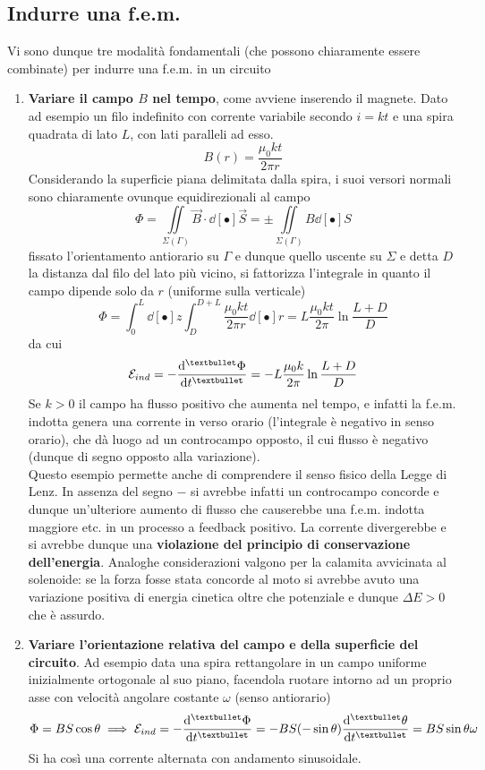 \subsection{Indurre una f.e.m.}
Vi sono dunque tre modalità fondamentali (che possono chiaramente essere combinate) per indurre una f.e.m. in un circuito
\begin{enumerate}
\item \textbf{Variare il campo $B$ nel tempo}, come avviene inserendo il magnete. Dato ad esempio un filo indefinito con corrente variabile secondo $i = kt$ e una spira quadrata di lato $L$, con lati paralleli ad esso.
\[B(r) = \frac{\mu_0 k t}{2 \pi r}\]
Considerando la superficie piana delimitata dalla spira, i suoi versori normali sono chiaramente ovunque equidirezionali al campo
\[\Phi = \iint\limits_{\Sigma (\Gamma)} \vec{B} \cdot \dd[•]{\vec{S}} = \pm \iint\limits_{\Sigma (\Gamma)} B \dd[•]{S}\]
fissato l'orientamento antiorario su $\Gamma$ e dunque quello uscente su $\Sigma$ e detta $D$ la distanza dal filo del lato più vicino, si fattorizza l'integrale in quanto il campo dipende solo da $r$ (uniforme sulla verticale)
\[\Phi = \int_0^L \dd[•]{z} \int_D^{D+L} \frac{\mu_0 k t}{2 \pi r} \dd[•]{r} = L \frac{\mu_0 k t}{2 \pi} \ln \frac{L+D}{D}\]
da cui
\[\mathcal{E}_{ind} = - \dv[•]{\Phi}{t} = - L \frac{\mu_0 k}{2 \pi} \ln \frac{L+D}{D}\]
Se $k > 0$ il campo ha flusso positivo che aumenta nel tempo, e infatti la f.e.m. indotta genera una corrente in verso orario (l'integrale è negativo in senso orario), che dà luogo ad un controcampo opposto, il cui flusso è negativo (dunque di segno opposto alla variazione).
\\Questo esempio permette anche di comprendere il senso fisico della Legge di Lenz. In assenza del segno $-$ si avrebbe infatti un controcampo concorde e dunque un'ulteriore aumento di flusso che causerebbe una f.e.m. indotta maggiore etc. in un processo a feedback positivo. La corrente divergerebbe e si avrebbe dunque una \textbf{violazione del principio di conservazione dell'energia}. Analoghe considerazioni valgono per la calamita avvicinata al solenoide: se la forza fosse stata concorde al moto si avrebbe avuto una variazione positiva di energia cinetica oltre che potenziale e dunque $\Delta E > 0$ che è assurdo.

\item \textbf{Variare l'orientazione relativa del campo e della superficie del circuito}. Ad esempio data una spira rettangolare in un campo uniforme inizialmente ortogonale al suo piano, facendola ruotare intorno ad un proprio asse con velocità angolare costante $\omega$ (senso antiorario)
\[\Phi = B S \cos \theta \implies \mathcal{E}_{ind} = - \dv[•]{\Phi}{t} = - B S (- \sin \theta) \dv[•]{\theta}{t} = BS \sin \theta \omega\]
Si ha così una corrente alternata con andamento sinusoidale.


\end{enumerate}
